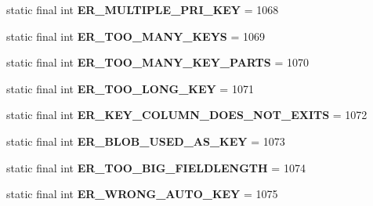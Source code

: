 \begin{DoxyCompactItemize}
static final int {\bfseries E\+R\+\_\+\+M\+U\+L\+T\+I\+P\+L\+E\+\_\+\+P\+R\+I\+\_\+\+K\+EY} = 1068
\item 
\mbox{\label{classcom_1_1mysql_1_1jdbc_1_1_mysql_error_numbers_ad242f1c8fbe5fd03fbd168a4d72384c4}} 
static final int {\bfseries E\+R\+\_\+\+T\+O\+O\+\_\+\+M\+A\+N\+Y\+\_\+\+K\+E\+YS} = 1069
\item 
\mbox{\label{classcom_1_1mysql_1_1jdbc_1_1_mysql_error_numbers_ab6c0324c507b607746333d24a596f637}} 
static final int {\bfseries E\+R\+\_\+\+T\+O\+O\+\_\+\+M\+A\+N\+Y\+\_\+\+K\+E\+Y\+\_\+\+P\+A\+R\+TS} = 1070
\item 
\mbox{\label{classcom_1_1mysql_1_1jdbc_1_1_mysql_error_numbers_aacf152b1b1eaedd7a5d2a568d3238736}} 
static final int {\bfseries E\+R\+\_\+\+T\+O\+O\+\_\+\+L\+O\+N\+G\+\_\+\+K\+EY} = 1071
\item 
\mbox{\label{classcom_1_1mysql_1_1jdbc_1_1_mysql_error_numbers_a854851a503d5d92a1d1a59c3ea827e33}} 
static final int {\bfseries E\+R\+\_\+\+K\+E\+Y\+\_\+\+C\+O\+L\+U\+M\+N\+\_\+\+D\+O\+E\+S\+\_\+\+N\+O\+T\+\_\+\+E\+X\+I\+TS} = 1072
\item 
\mbox{\label{classcom_1_1mysql_1_1jdbc_1_1_mysql_error_numbers_a510273309c559cffe3630cf63746c6d2}} 
static final int {\bfseries E\+R\+\_\+\+B\+L\+O\+B\+\_\+\+U\+S\+E\+D\+\_\+\+A\+S\+\_\+\+K\+EY} = 1073
\item 
\mbox{\label{classcom_1_1mysql_1_1jdbc_1_1_mysql_error_numbers_a7f85d8abd6acbee2da8bb1944af14b40}} 
static final int {\bfseries E\+R\+\_\+\+T\+O\+O\+\_\+\+B\+I\+G\+\_\+\+F\+I\+E\+L\+D\+L\+E\+N\+G\+TH} = 1074
\item 
\mbox{\label{classcom_1_1mysql_1_1jdbc_1_1_mysql_error_numbers_ab11b3e6b2d911f58b6428052187d6ea9}} 
static final int {\bfseries E\+R\+\_\+\+W\+R\+O\+N\+G\+\_\+\+A\+U\+T\+O\+\_\+\+K\+EY} = 1075
\item 
\mbox{\label{classcom_1_1mysql_1_1jdbc_1_1_mysql_error_numbers_af293538a004496f4d3f8022d522f0584}} 

\end{DoxyCompactItemize}
